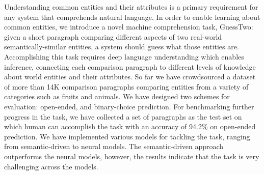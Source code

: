 Understanding common entities and their attributes is a primary requirement for any system that comprehends natural language. In order to enable learning about common entities, we introduce a novel machine comprehension task, GuessTwo: given a short paragraph comparing different aspects of two real-world semantically-similar entities, a system should guess what those entities are. Accomplishing this task requires deep language understanding which enables inference, connecting each comparison paragraph to different levels of knowledge about world entities and their attributes. So far we have crowdsourced a dataset of more than 14K comparison paragraphs comparing entities from a variety of categories such as fruits and animals. We have designed two schemes for evaluation: open-ended, and binary-choice prediction. For benchmarking further progress in the task, we have collected a set of paragraphs as the test set on which human can accomplish the task with an accuracy of 94.2\% on open-ended prediction. We have implemented various models for tackling the task, ranging from semantic-driven to neural models. The semantic-driven approach outperforms the neural models, however, the results indicate that the task is very challenging across the models.
